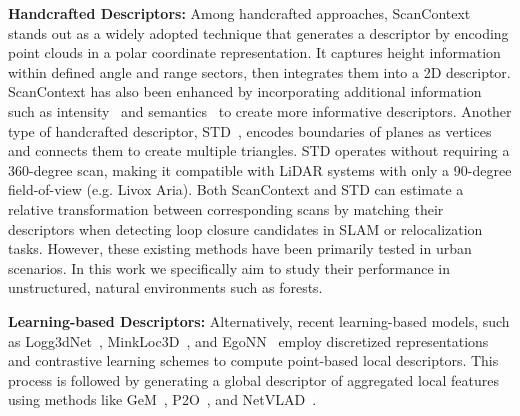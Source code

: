 \noindent \textbf{Handcrafted Descriptors:}\hspace{0.5em}  Among handcrafted approaches, ScanContext\cite{kim2018iros,kim2021tro} stands out as a widely adopted technique that generates a descriptor by encoding point clouds in a polar coordinate representation. It captures height information within defined angle and range sectors, then integrates them into a 2D descriptor. 
ScanContext has also been enhanced by incorporating additional information such as intensity~\cite{wang2020icra} and semantics~\cite{li2021iros} to create more informative descriptors. Another type of handcrafted descriptor, STD~\cite{yuan2023icra}, encodes boundaries of planes as vertices and connects them to create multiple triangles. STD operates without requiring a 360-degree scan, making it compatible with LiDAR systems with only a 90-degree field-of-view (e.g. Livox Aria). Both ScanContext and STD can estimate a relative transformation between corresponding scans by matching their descriptors when detecting loop closure candidates in SLAM or relocalization tasks. However, these existing methods have been primarily tested in urban scenarios. In this work we specifically aim to study their performance in unstructured, natural environments such as forests.
\vspace{8pt}


\noindent \textbf{Learning-based Descriptors:} \hspace{0.5em} 
Alternatively, recent learning-based models, such as Logg3dNet~\cite{vidanapathirana2022icra}, MinkLoc3D~\cite{komorowski2021wacv}, and EgoNN~\cite{komorowski2022ral} employ discretized representations and contrastive learning schemes to compute point-based local descriptors. This process is followed by generating a global descriptor of aggregated local features using methods like GeM~\cite{radenovic2019pami}, P2O~\cite{vidanapathirana2021icra}, and NetVLAD~\cite{arandjelovic2018pami}.  

